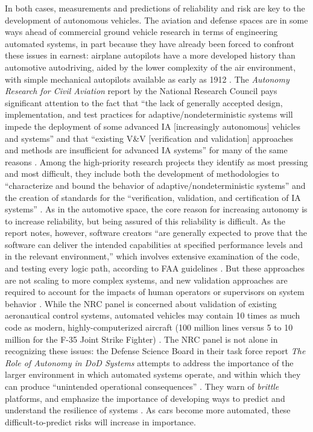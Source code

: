 
In both cases, measurements and predictions of reliability and risk
are key to the development of autonomous vehicles. The aviation and
defense spaces are in some ways ahead of commercial ground vehicle
research in terms of engineering automated systems, in part because
they have already been forced to confront these issues in earnest:
airplane autopilots have a more developed history than automotive
autodriving, aided by the lower complexity of the air environment,
with simple mechanical autopilots available as early as
1912 \cite[p. 16]{NRCAutonomy}. The \emph{Autonomy Research for
  Civil Aviation} report by the National Research Council pays
significant attention to the fact that ``the lack of generally
accepted design, implementation, and test practices for
adaptive/nondeterministic systems will impede the deployment of some
advanced IA [increasingly autonomous] vehicles and systems'' and that
``existing V\&V [verification and
  validation] approaches and methods are insufficient for advanced IA
systems'' for many of the same reasons \cite[p. 2]{NRCAutonomy}.
Among the high-priority research projects they identify as
most pressing and most difficult, they include both the development of
methodologies to ``characterize and bound the behavior of
adaptive/nondeterministic systems'' and the creation of standards for
the ``verification, validation, and certification of IA
systems'' \cite[p. 4]{NRCAutonomy}. As in the automotive space, the
core reason for increasing autonomy is to increase reliability, but
being assured of this reliability is difficult. As the report notes,
however, software creators ``are generally expected to prove that the
software can deliver the intended capabilities at specified
performance levels and in the relevant environment,'' which involves
extensive examination of the code, and testing every logic path,
according to FAA guidelines \cite[p. 39--40]{NRCAutonomy}. But
these approaches are not scaling to more complex systems, and new
validation approaches are required to account for the impacts of human
operators or supervisors on system behavior \cite[p.
  40]{NRCAutonomy}. While
the NRC panel is concerned about validation of existing aeronautical
control systems, automated vehicles may contain 10 times as much code
as modern, highly-computerized aircraft (100 million lines versus 5 to
10 million for the F-35 Joint Strike Fighter)
\cite{reutersF35}.
The NRC panel is not alone in recognizing these 
issues: the Defense Science Board in their task force report \emph{The
  Role of Autonomy in DoD Systems} attempts to address the importance
of the larger environment in which automated systems operate, and
within which they can produce ``unintended operational
consequences'' \cite[p. 2]{DSB}. They warn of \emph{brittle}
platforms, and emphasize the importance of developing ways to predict
and understand the resilience of systems \cite[p. 7, 11]{DSB}. As cars
become more automated, these difficult-to-predict risks will increase
in importance.

